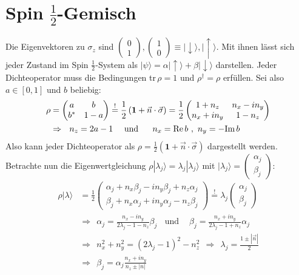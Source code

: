 \documentclass[a4paper,12pt]{article}
\newcommand{\kla}{}
\newcommand{\klam}{}
\newcommand{\tecxt}{}
\newcommand{\Ket}{}
\begin{document}
\section{Spin $\frac{1}{2}$-Gemisch}
Die Eigenvektoren zu $\sigma_z$ sind $\begin{pmatrix}0 \\ 1\end{pmatrix},\begin{pmatrix}1 \\ 0\end{pmatrix}\equiv\Ket | {\downarrow} \rangle,\Ket | {\uparrow} \rangle$. Mit ihnen lässt sich jeder Zustand im Spin $\frac{1}{2}$-System als $\Ket | {\psi} \rangle=\alpha\Ket | {\uparrow} \rangle+\beta\Ket | {\downarrow} \rangle$ darstellen. Jeder Dichteoperator muss die Bedingungen tr\,$\rho=1$ und $\rho^\dagger=\rho$ erfüllen. Sei also $a\in\klam\left[ {0,1} \right]$ und $b$ beliebig:
\begin{align*}
\rho&=\begin{pmatrix}
a&b\\ b^\ast &1-a
\end{pmatrix}\overset{!}{=}\frac{1}{2}\kla\left( {\mathbf{1}+\vec{n}\cdot\vec{\sigma}} \right)=\frac{1}{2}\begin{pmatrix}
1+n_z&n_x-in_y \\ n_x+in_y&1-n_z
\end{pmatrix}\\
&\Rightarrow\ \ n_z=2a-1\ \ \ \ \tecxt\text{und }\ \ \ \ n_x=\tecxt\text{Re\,}b\ ,\ n_y=-\tecxt\text{Im\,}b
\end{align*}
Also kann jeder Dichteoperator als $\rho=\frac{1}{2}\kla\left( {\mathbf{1}+\vec{n}\cdot\vec{\sigma}} \right)$ dargestellt werden.\\
Betrachte nun die Eigenwertgleichung $\rho\Ket | {\lambda_j} \rangle=\lambda_j\Ket | {\lambda_j} \rangle$ mit $\Ket | {\lambda_j} \rangle=\begin{pmatrix}
\alpha_j\\ \beta_j
\end{pmatrix}$:
\begin{align*}
\rho\Ket | {\lambda} \rangle&=\frac{1}{2}\begin{pmatrix}
\alpha_j+n_x\beta_j -in_y\beta_j + n_z\alpha_j  \\  \beta_j+n_x\alpha_j +in_y\alpha_j -n_z\beta_j
\end{pmatrix}\overset{!}{=}\lambda_j\begin{pmatrix}
\alpha_j\\ \beta_j
\end{pmatrix}\\
&\Rightarrow\ \ \alpha_j=\frac{n_x-in_y}{2\lambda_j-1-n_z}\beta_j\ \ \ \ \tecxt\text{und }\ \ \ \ \beta_j=\frac{n_x+in_y}{2\lambda_j-1+n_z}\alpha_j\\
&\Rightarrow\ \ n_x^2+n_y^2=\kla\left( {2\lambda_j-1} \right)^2-n_z^2\ \ \Rightarrow\ \ \lambda_j=\frac{1\pm |\vec{n}|}{2}\\
&\Rightarrow\ \ \beta_j=\alpha_j\frac{n_x+in_y}{n_z\pm |n|}
\end{align*}
\end{document}
